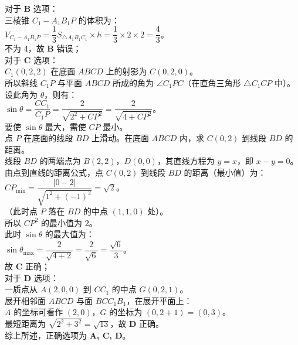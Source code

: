 {  对于 \textbf{B} 选项：\\
  三棱锥 \(C_1 - A_1B_1P\) 的体积为：\\
  \(V_{C_1-A_1B_1P} = \dfrac{1}{3} S_{\triangle A_1B_1C_1} \times h = \dfrac{1}{3} \times 2 \times 2 = \dfrac{4}{3}\)。\\
  不为 4，故 \textbf{B} 错误；\\
  对于 \textbf{C} 选项：\\
  \(C_1(0,2,2)\) 在底面 \(ABCD\) 上的射影为 \(C(0,2,0)\)。\\
  所以斜线 \(C_1P\) 与平面 \(ABCD\) 所成的角为 \(\angle C_1PC\)（在直角三角形 \(\triangle C_1CP\) 中）。\\
  设此角为 \(\theta\)，则有：\\
  \(\sin\theta = \dfrac{CC_1}{C_1P} = \dfrac{2}{\sqrt{2^2 + CP^2}} = \dfrac{2}{\sqrt{4 + CP^2}}\)。\\
  要使 \(\sin\theta\) 最大，需使 \(CP\) 最小。\\
  点 \(P\) 在底面的线段 \(BD\) 上滑动。在底面 \(ABCD\) 内，求 \(C(0,2)\) 到线段 \(BD\) 的距离。\\
  线段 \(BD\) 的两端点为 \(B(2,2)\)，\(D(0,0)\)，其直线方程为 \(y = x\)，即 \(x - y = 0\)。\\
  由点到直线的距离公式，点 \(C(0,2)\) 到线段 \(BD\) 的距离（最小值）为：\\
  \(CP_{\min} = \dfrac{|0 - 2|}{\sqrt{1^2 + (-1)^2}} = \sqrt{2}\)。\\
  （此时点 \(P\) 落在 \(BD\) 的中点 \((1,1,0)\) 处）。\\
  所以 \(CP^2\) 的最小值为 2。\\
  此时 \(\sin\theta\) 的最大值为：\\
  \(\sin\theta_{\max} = \dfrac{2}{\sqrt{4 + 2}} = \dfrac{2}{\sqrt{6}} = \dfrac{\sqrt{6}}{3}\)。\\
  故 \textbf{C} 正确；\\
  对于 \textbf{D} 选项：\\
  一质点从 \(A(2,0,0)\) 到 \(CC_1\) 的中点 \(G(0,2,1)\)。\\
  展开相邻面 \(ABCD\) 与面 \(BCC_1B_1\)，在展开平面上：\\
  \(A\) 的坐标可看作 \((2,0)\)，\(G\) 的坐标为 \((0, 2+1) = (0,3)\)。\\
  最短距离为 \(\sqrt{2^2 + 3^2} = \sqrt{13}\)，故 \textbf{D} 正确。\\
  综上所述，正确选项为 \textbf{A, C, D}。%
}

\newcommand{\qSolidCubeDynamicAngleDiagnosis}{%
  用于课堂精准变式训练。考查正方体截面多边形判定、线面角正弦最大值的动态几何转化（利用投影把角转化为直角三角形内边比）、以及表面爬行最短距离计算。
}

\newcommand{\qSolidCubeDynamicAngleTeachingNotes}{%
  \item \textbf{重难点提示}：
    \begin{itemize}
      \item C 选项：强调“角最大 $\iff$ 斜边最小 $\iff$ 投影 $CP$ 最小”。引导学生把空间几何的最值问题，降维转化为平面几何点到线段的距离。
      \item A 选项：截面梯形判定中，用空间向量平行性来证明，能让学生明确知道哪两边平行。
    \end{itemize}
}

